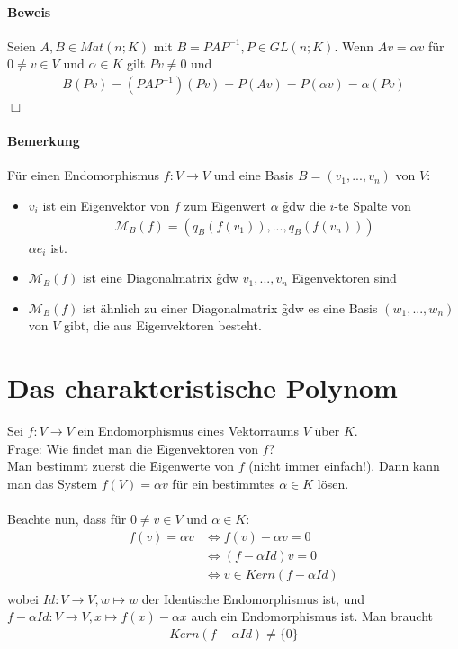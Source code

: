\paragraph{Beweis}
Seien $A, B \in Mat(n;K)$ mit $B = PAP^{-1}, P \in GL(n;K)$. Wenn $Av = \alpha v$ für $0 \neq v \in V$ und $\alpha \in K$ gilt $P v \neq 0$ und
\begin{align}
B(Pv) = (PAP^{-1})(Pv) = P(Av) = P(\alpha v) = \alpha (Pv)
\end{align}
\hfill $\Box$

\paragraph{Bemerkung}
Für einen Endomorphismus $f: V \rightarrow V$ und eine Basis $B = (v_1, ..., v_n)$ von $V$:
\begin{itemize}
 \item $v_i$ ist ein Eigenvektor von $f$ zum Eigenwert $\alpha$ \f{gdw} die $i$-te Spalte von 
\begin{align}
\mathcal{M}_B(f) = (q_B(f(v_1)), ..., q_B(f(v_n)))
\end{align}
$\alpha e_i$ ist.
 \item $\mathcal{M}_B(f)$ ist eine \f{Diagonalmatrix} \f{gdw} $v_1, ..., v_n$ Eigenvektoren sind
 \item $\mathcal{M}_B(f)$ ist ähnlich zu einer Diagonalmatrix \f{gdw} es eine Basis $(w_1, ..., w_n)$ von $V$ gibt, die aus Eigenvektoren besteht.
\end{itemize}

\section{Das charakteristische Polynom} %
Sei $f: V \rightarrow V$ ein Endomorphismus eines Vektorraums $V$ über $K$.\\
\f{Frage: } Wie findet man die \f{Eigenvektoren} von $f$? \\
Man bestimmt zuerst die \f{Eigenwerte} von $f$ (nicht immer einfach!). Dann kann man das System $f(V) = \alpha v$ für ein bestimmtes $\alpha \in K$ lösen. \\\\
Beachte nun, dass für $0 \neq v \in V$ und $\alpha \in K$:
\begin{align}
f(v) = \alpha v  &\Leftrightarrow f(v) - \alpha v = 0 \\
&\Leftrightarrow (f- \alpha Id)v = 0 \\
&\Leftrightarrow v \in Kern(f-\alpha Id) \\
\end{align}
wobei $Id: V \rightarrow V, w \mapsto w$ der Identische Endomorphismus ist, und $f- \alpha Id: V \rightarrow V, x \mapsto f(x) - \alpha x$ auch ein Endomorphismus ist. Man braucht
\begin{align}
Kern(f-\alpha Id) \neq \{0\}
\end{align}

